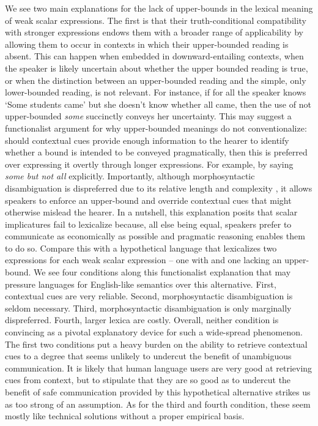 \documentclass[a4paper]{article}
\begin{document}
We see two main explanations for the lack of upper-bounds in the lexical meaning of weak scalar expressions. The first is that their truth-conditional compatibility with stronger expressions endows them with a broader range of applicability by allowing them to occur in contexts in which their upper-bounded reading is absent. This can happen when embedded in downward-entailing contexts, when the speaker is likely uncertain about whether the upper bounded reading is true, or when the distinction between an upper-bounded reading and the simple, only lower-bounded reading, is not relevant. For instance, if for all the speaker knows `Some students came' but she doesn't know whether all came, then the use of not upper-bounded {\em some} succinctly conveys her uncertainty. This may suggest a functionalist argument for why upper-bounded meanings do not conventionalize: should contextual cues provide enough information to the hearer to identify whether a bound is intended to be conveyed pragmatically, then this is preferred over expressing it overtly through longer expressions. For example, by saying {\em some but not all} explicitly. Importantly, although morphosyntactic disambiguation is dispreferred due to its relative length and complexity \citep{piantadosi+etal:2012b}, it allows speakers to enforce an upper-bound and override contextual cues that might otherwise mislead the hearer. In a nutshell, this explanation posits that scalar implicatures fail to lexicalize because, all else being equal, speakers prefer to communicate as economically as possible and pragmatic reasoning enables them to do so. Compare this with a hypothetical language that lexicalizes two expressions for each weak scalar expression -- one with and one lacking an upper-bound. We see four conditions along this functionalist explanation that may pressure languages for English-like semantics over this alternative. First, contextual cues are very reliable. Second, morphosyntactic disambiguation is seldom necessary. Third, morphosyntactic disambiguation is only marginally dispreferred. Fourth, larger lexica are costly. Overall, neither condition is convincing as a pivotal explanatory device for such a wide-spread phenomenon. The first two conditions put a heavy burden on the ability to retrieve contextual cues to a degree that seems unlikely to undercut the benefit of unambiguous communication. It is likely that human language users are very good at retrieving cues from context, but to stipulate that they are so good as to undercut the benefit of safe communication provided by this hypothetical alternative strikes us as too strong of an assumption.  As for the third and fourth condition, these seem mostly like technical solutions without a proper empirical basis. 
\end{document}
